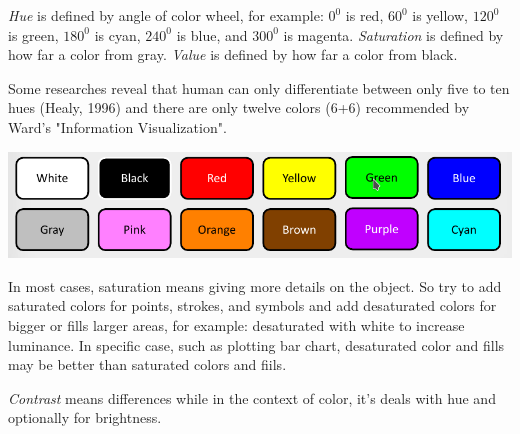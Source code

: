 \documentclass[11pt]{article}
\makeatletter
\def\maxwidth{\ifdim\Gin@nat@width>\linewidth\linewidth
    \else\Gin@nat@width\fi}
\let\Oldincludegraphics\includegraphics
\renewcommand{\includegraphics}[1]{\Oldincludegraphics[width=.8\maxwidth]{#1}}
\makeatother
\begin{document}
\emph{Hue} is defined by angle of color wheel, for example: \(0^0\) is
red, \(60^0\) is yellow, \(120^0\) is green, \(180^0\) is cyan,
\(240^0\) is blue, and \(300^0\) is magenta. \emph{Saturation} is
defined by how far a color from gray. \emph{Value} is defined by how far
a color from black.

Some researches reveal that human can only differentiate between only
five to ten hues (Healy, 1996) and there are only twelve colors (6+6)
recommended by Ward's "Information Visualization".

\includegraphics{images/12-colors.png}

In most cases, saturation means giving more details on the object. So
try to add saturated colors for points, strokes, and symbols and add
desaturated colors for bigger or fills larger areas, for example:
desaturated with white to increase luminance. In specific case, such as
plotting bar chart, desaturated color and fills may be better than
saturated colors and fiils.

\emph{Contrast} means differences while in the context of color, it's
deals with hue and optionally for brightness.


    
    
    
    
\end{document}
